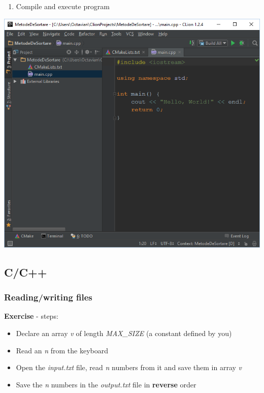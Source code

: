 \documentclass[../en-fa-lab.tex]{subfiles}
\begin{document}
\begin{enumerate}
\def\labelenumi{\arabic{enumi}.}
\setcounter{enumi}{3}
\item
  Compile and execute program
\end{enumerate}

\includegraphics[width=\textwidth]{../Resources/lab0/image10.png}


\subsection{C/C++}\label{cc}

\subsubsection{Reading/writing files}\label{readingwriting-files}

\textbf{Exercise} - steps:

\begin{itemize}
\item
  Declare an array \emph{v} of length \emph{MAX\_SIZE} (a constant
  defined by you)
\item
  Read an \emph{n} from the keyboard
\item
  Open the \emph{input.txt} file, read \emph{n} numbers from it and save
  them in array \emph{v}
\item
  Save the \emph{n} numbers in the \emph{output.txt} file in
  \textbf{reverse} order
\end{itemize}
\end{document}
